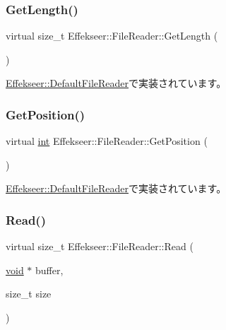 \subsubsection{\texorpdfstring{Get\+Length()}{GetLength()}}
{\footnotesize\ttfamily virtual size\+\_\+t Effekseer\+::\+File\+Reader\+::\+Get\+Length (\begin{DoxyParamCaption}{ }\end{DoxyParamCaption})\hspace{0.3cm}{\ttfamily [pure virtual]}}



\mbox{\hyperlink{class_effekseer_1_1_default_file_reader_a2663a6f3b6bf3aaabadcfe371a85b15d}{Effekseer\+::\+Default\+File\+Reader}}で実装されています。

\mbox{\label{class_effekseer_1_1_file_reader_ad69aa533374ee6661938c7a81495b6d7}} 
\subsubsection{\texorpdfstring{Get\+Position()}{GetPosition()}}
{\footnotesize\ttfamily virtual \mbox{\hyperlink{namespace_effekseer_ace0abf7c2e6947e519ebe8b54cbcc30a}{int}} Effekseer\+::\+File\+Reader\+::\+Get\+Position (\begin{DoxyParamCaption}{ }\end{DoxyParamCaption})\hspace{0.3cm}{\ttfamily [pure virtual]}}



\mbox{\hyperlink{class_effekseer_1_1_default_file_reader_a86001f21782b7cb40a5e0ca4ee155aca}{Effekseer\+::\+Default\+File\+Reader}}で実装されています。

\mbox{\label{class_effekseer_1_1_file_reader_a6274b775770e8ac9ba4f212c80e94be1}} 
\subsubsection{\texorpdfstring{Read()}{Read()}}
{\footnotesize\ttfamily virtual size\+\_\+t Effekseer\+::\+File\+Reader\+::\+Read (\begin{DoxyParamCaption}\item[{\mbox{\hyperlink{namespace_effekseer_ab34c4088e512200cf4c2716f168deb56}{void}} $\ast$}]{buffer,  }\item[{size\+\_\+t}]{size }\end{DoxyParamCaption})\hspace{0.3cm}{\ttfamily [pure virtual]}}



